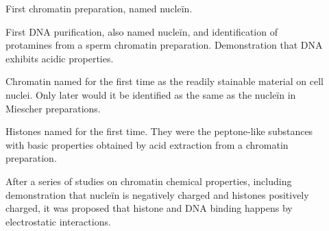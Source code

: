       \begin{description}
        \item[\cite{miescher1871-chromatin}]
        First chromatin preparation, named nucleïn.

        \item[\cite{miescher1874-protamines}]
        First DNA purification, also named nucleïn, and identification
        of protamines from a sperm chromatin preparation.  Demonstration
        that DNA exhibits acidic properties.

        \item[\cite{flemming1880-chromatin}]
        Chromatin named for the first time as the readily stainable
        material on cell nuclei. Only later would it be identified
        as the same as the nucleïn in Miescher preparations.

        \item[\cite{kossel1884-histones}]
        Histones named for the first time.  They were the peptone-like
        substances with basic properties obtained by acid extraction from
        a chromatin preparation.

        \item[\cite{huiskamp1903-electrostatic}]
        After a series of studies on chromatin chemical properties,
        including demonstration that nucleïn is negatively charged
        and histones positively charged, it was proposed that
        histone and DNA binding happens by electrostatic interactions.


\end{description}

